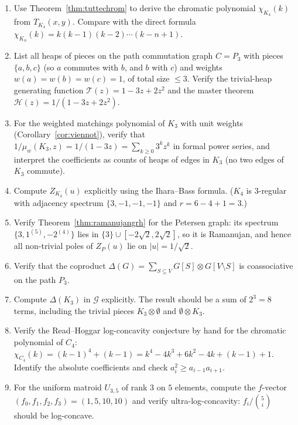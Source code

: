 \begin{enumerate}
\item Use Theorem~\ref{thm:tuttechrom} to derive the chromatic polynomial
$\chi_{K_4}(k)$ from $T_{K_4}(x, y)$. Compare with the direct formula
$\chi_{K_n}(k) = k(k - 1)(k - 2) \cdots (k - n + 1)$.

\item List all heaps of pieces on the path commutation graph $C = P_3$ with
pieces $\{a, b, c\}$ (so $a$ commutes with $b$, and $b$ with $c$) and
weights $w(a) = w(b) = w(c) = 1$, of total
size $\le 3$. Verify the trivial-heap generating function
$\mathcal T(z) = 1 - 3z + 2z^2$ and the master theorem
$\mathcal H(z) = 1/(1 - 3z + 2z^2)$.

\item For the weighted matchings polynomial of $K_3$ with unit weights
(Corollary~\ref{cor:viennot}), verify that
$1/\mu_w(K_3, z) = 1/(1 - 3z) = \sum_{k \ge 0} 3^k z^k$ in formal power
series, and interpret the coefficients as counts of heaps of edges in
$K_3$ (no two edges of $K_3$ commute).

\item Compute $Z_{K_4}(u)$ explicitly using the Ihara--Bass formula. ($K_4$
is $3$-regular with adjacency spectrum $\{3, -1, -1, -1\}$ and
$r = 6 - 4 + 1 = 3$.)

\item Verify Theorem~\ref{thm:ramanujangrh} for the Petersen graph: its
spectrum $\{3, 1^{(5)}, -2^{(4)}\}$ lies in
$\{3\} \cup [-2\sqrt{2}, 2\sqrt{2}]$, so it is Ramanujan, and hence
all non-trivial poles of $Z_P(u)$ lie on $|u| = 1/\sqrt{2}$.

\item Verify that the coproduct
$\Delta(G) = \sum_{S \subseteq V} G[S] \otimes G[V \setminus S]$ is
coassociative on the path $P_3$.

\item Compute $\Delta(K_3)$ in $\mathcal G$ explicitly. The result should
be a sum of $2^3 = 8$ terms, including the trivial pieces
$K_3 \otimes \emptyset$ and $\emptyset \otimes K_3$.

\item Verify the Read--Hoggar log-concavity conjecture by hand for the chromatic
polynomial of $C_4$:
$\chi_{C_4}(k) = (k - 1)^4 + (k - 1) = k^4 - 4k^3 + 6k^2 - 4k + (k - 1) + 1$.
Identify the absolute coefficients and check $a_i^2 \ge a_{i-1} a_{i+1}$.

\item For the uniform matroid $U_{3,5}$ of rank $3$ on $5$ elements,
compute the $f$-vector $(f_0, f_1, f_2, f_3) = (1, 5, 10, 10)$ and
verify ultra-log-concavity: $f_i / \binom{5}{i}$ should be log-concave.


\end{enumerate}
